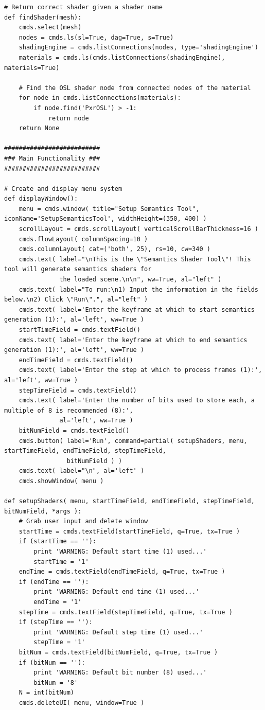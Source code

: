 \documentclass[conference]{IEEEtran}
\begin{document}
{{\begin{verbatim}
# Return correct shader given a shader name
def findShader(mesh):
    cmds.select(mesh)
    nodes = cmds.ls(sl=True, dag=True, s=True)
    shadingEngine = cmds.listConnections(nodes, type='shadingEngine')
    materials = cmds.ls(cmds.listConnections(shadingEngine), materials=True)
    
    # Find the OSL shader node from connected nodes of the material
    for node in cmds.listConnections(materials):
        if node.find('PxrOSL') > -1:
            return node
    return None

##########################
### Main Functionality ###
##########################

# Create and display menu system
def displayWindow():
    menu = cmds.window( title="Setup Semantics Tool", iconName='SetupSemanticsTool', widthHeight=(350, 400) )
    scrollLayout = cmds.scrollLayout( verticalScrollBarThickness=16 )
    cmds.flowLayout( columnSpacing=10 )
    cmds.columnLayout( cat=('both', 25), rs=10, cw=340 )
    cmds.text( label="\nThis is the \"Semantics Shader Tool\"! This tool will generate semantics shaders for
               the loaded scene.\n\n", ww=True, al="left" )
    cmds.text( label="To run:\n1) Input the information in the fields below.\n2) Click \"Run\".", al="left" )
    cmds.text( label='Enter the keyframe at which to start semantics generation (1):', al='left', ww=True )
    startTimeField = cmds.textField()
    cmds.text( label='Enter the keyframe at which to end semantics generation (1):', al='left', ww=True )
    endTimeField = cmds.textField()
    cmds.text( label='Enter the step at which to process frames (1):', al='left', ww=True )
    stepTimeField = cmds.textField()
    cmds.text( label='Enter the number of bits used to store each, a multiple of 8 is recommended (8):',
               al='left', ww=True )
    bitNumField = cmds.textField()
    cmds.button( label='Run', command=partial( setupShaders, menu, startTimeField, endTimeField, stepTimeField,
                 bitNumField ) )
    cmds.text( label="\n", al='left' )
    cmds.showWindow( menu )

def setupShaders( menu, startTimeField, endTimeField, stepTimeField, bitNumField, *args ):
    # Grab user input and delete window
    startTime = cmds.textField(startTimeField, q=True, tx=True )
    if (startTime == ''):
        print 'WARNING: Default start time (1) used...'
        startTime = '1'
    endTime = cmds.textField(endTimeField, q=True, tx=True )
    if (endTime == ''):
        print 'WARNING: Default end time (1) used...'
        endTime = '1'
    stepTime = cmds.textField(stepTimeField, q=True, tx=True )
    if (stepTime == ''):
        print 'WARNING: Default step time (1) used...'
        stepTime = '1'
    bitNum = cmds.textField(bitNumField, q=True, tx=True )
    if (bitNum == ''):
        print 'WARNING: Default bit number (8) used...'
        bitNum = '8'
    N = int(bitNum)
    cmds.deleteUI( menu, window=True )
    

\end{verbatim}}}
\end{document}
